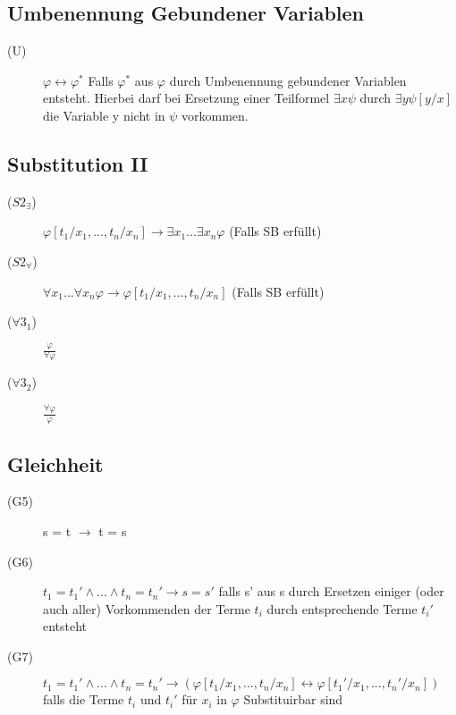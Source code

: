 \documentclass[12pt,a4paper]{article} %
\begin{document}
	\subsection{Umbenennung Gebundener Variablen}
	\begin{description}
		\item[(U)] $\varphi \leftrightarrow \varphi^*$ \newline
		Falls $\varphi^*$ aus $\varphi$ durch Umbenennung gebundener Variablen entsteht. Hierbei darf bei Ersetzung einer Teilformel $\exists x \psi$ durch $\exists y \psi[y/x]$ die Variable y nicht in $\psi$ vorkommen.
	\end{description}

	\subsection{Substitution II}
	\begin{description}
		\item[($S2_{\exists}$)] $\varphi[t_1/x_1, ..., t_n/x_n] \rightarrow \exists x_1 ... \exists x_n \varphi$ (Falls SB erfüllt)
		\item[($S2_{\forall}$)] $\forall x_1 ... \forall x_n \varphi \rightarrow \varphi[t_1/x_1, ..., t_n/x_n]$ (Falls SB erfüllt)
		\item[($\forall 3_1$)] $\frac{\varphi}{\forall \varphi}$
		\item[($\forall 3_2$)] $\frac{\forall \varphi}{\varphi}$
	\end{description}

	\subsection{Gleichheit}
	\begin{description}
		\item[(G5)] s = t $\rightarrow$ t = s
		\item[(G6)] $t_1 = t_1' \land ... \land t_n = t_n' \rightarrow s = s'$ \newline
		falls s' aus s durch Ersetzen einiger (oder auch aller) Vorkommenden der Terme $t_i$ durch entsprechende Terme $t_i'$ entsteht
		\item[(G7)] $t_1 = t_1' \land ... \land t_n = t_n' \rightarrow (\varphi[t_1/x_1, ..., t_n/x_n] \leftrightarrow \varphi[t_1'/x_1, ..., t_n'/x_n])$ \newline 
		falls die Terme $t_i$ und $t_i'$ für $x_i$ in $\varphi$ Substituirbar sind
	\end{description}
\end{document}
